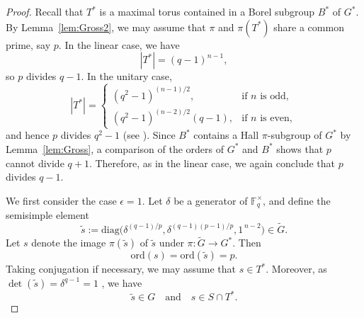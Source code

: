\documentclass[12pt]{amsart}
\theoremstyle{definition}
\numberwithin{equation}{section}
\newcommand{\ord}{{\mathrm {ord}}}
\newcommand{\diag}{{\mathrm {diag}}}
\newcommand{\FF}{{\mathbb F}}
\begin{document}
\begin{proof}
Recall that $T^*$ is a maximal torus contained in a Borel subgroup
$B^*$ of $G^*$. By Lemma~\ref{lem:Gross2}, we may assume that $\pi$
and $\pi(T^*)$ share a common prime, say $p$. In the linear case, we
have
\[
|T^*| = (q-1)^{n-1},
\]
so %
$p$ divides $q-1$. In the unitary %
case,
\[
|T^*| =
\begin{cases}
(q^2-1)^{(n-1)/2}, & \text{if $n$ is odd},\\[2pt]
(q^2-1)^{(n-2)/2}(q-1), & \text{if $n$ is even},
\end{cases}
\]
and %
hence $p$ divides $q^2-1$ (see \cite[p.~74]{Carter85}). Since
$B^*$ contains a Hall $\pi$-subgroup of $G^*$ by
Lemma~\ref{lem:Gross}, a comparison of the orders of $G^*$ and $B^*$
shows that $p$ cannot divide $q+1$. Therefore, as in the linear
case, we again conclude that $p$ divides $q-1$.



We first consider the case $\epsilon=1$. Let $\delta$ be a generator
of $\FF_{q}^\times$, and define the semisimple %
element
\[
\widetilde{s} := \diag\!\bigl( \delta^{(q-1)/p},
\delta^{(q-1)(p-1)/p}, 1^{\,n-2} \bigr) \in \widetilde{G}.
\]
Let %
$s$ denote the image $\pi(\widetilde{s})$ of $\widetilde{s}$
under $\pi:\widetilde{G}\to G^*$. Then
\[
\ord(s) = \ord(\widetilde{s}) = p.
\]
Taking %
conjugation if necessary, we may assume that $s\in T^*$.
Moreover, as $\det(\widetilde{s})=\delta^{q-1}=1$%
, we have
\[
\widetilde{s}\in G \quad\text{and}\quad s\in S\cap T^*.
\]


\end{proof}
\end{document}
